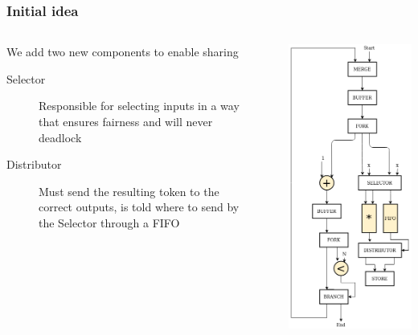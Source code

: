 \documentclass{beamer}
\begin{document}
\begin{frame}[fragile]
\begin{columns}[T]
\begin{column}{0.45\textwidth}
    \end{column}
  \end{columns}
\end{frame}

\begin{frame}[fragile]
\frametitle{Initial idea}
\begin{columns}[T]
    \begin{column}{0.45\textwidth}
    We add two new components to enable sharing \newline
    \begin{description}
        \item[Selector] Responsible for selecting inputs in a way that ensures fairness and will never deadlock
        \item[Distributor] Must send the resulting token to the correct outputs, is told where to send by the Selector through a FIFO
    \end{description}
    \end{column}
    \begin{column}{0.1\textwidth}
    \end{column}
    \begin{column}{0.45\textwidth}
      \includegraphics[scale=0.28]{shared_base_case.png}

\end{column}
\end{columns}
\end{frame}
\end{document}
